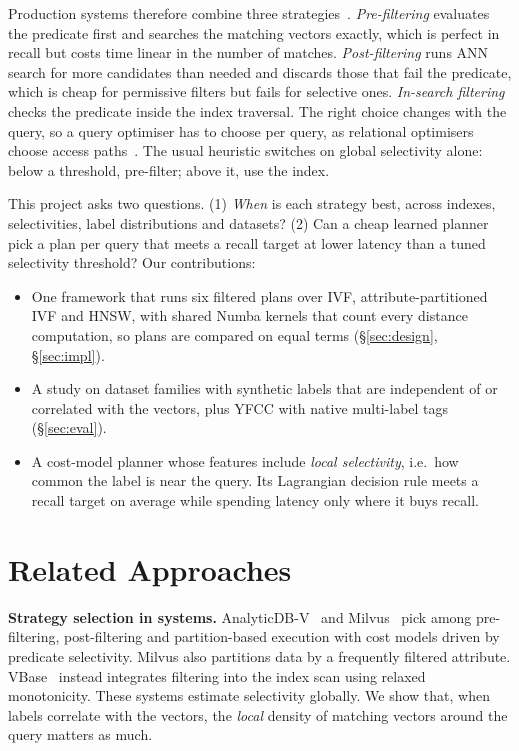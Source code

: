 \documentclass[sigconf,nonacm]{acmart}
\begin{document}
Production systems therefore combine three strategies~\cite{wei2020analyticdbv,wang2021milvus}. \emph{Pre-filtering} evaluates the predicate first and searches the matching vectors exactly, which is perfect in recall but costs time linear in the number of matches. \emph{Post-filtering} runs ANN search for more candidates than needed and discards those that fail the predicate, which is cheap for permissive filters but fails for selective ones. \emph{In-search filtering} checks the predicate inside the index traversal. The right choice changes with the query, so a query optimiser has to choose per query, as relational optimisers choose access paths~\cite{selinger1979access}. The usual heuristic switches on global selectivity alone: below a threshold, pre-filter; above it, use the index.

This project asks two questions. (1) \emph{When} is each strategy best, across indexes, selectivities, label distributions and datasets? (2) Can a cheap learned planner pick a plan per query that meets a recall target at lower latency than a tuned selectivity threshold? Our contributions:
\begin{itemize}
\item One framework that runs six filtered plans over IVF, attribute-partitioned IVF and HNSW, with shared Numba kernels that count every distance computation, so plans are compared on equal terms (\S\ref{sec:design}, \S\ref{sec:impl}).
\item A study on \nDatasets{} dataset families with synthetic labels that are independent of or correlated with the vectors, plus YFCC with native multi-label tags (\S\ref{sec:eval}).
\item A cost-model planner whose features include \emph{local selectivity}, i.e.\ how common the label is near the query. Its Lagrangian decision rule meets a recall target on average while spending latency only where it buys recall.
\end{itemize}

\section{Related Approaches}

\textbf{Strategy selection in systems.} AnalyticDB-V~\cite{wei2020analyticdbv} and Milvus~\cite{wang2021milvus} pick among pre-filtering, post-filtering and partition-based execution with cost models driven by predicate selectivity. Milvus also partitions data by a frequently filtered attribute. VBase~\cite{zhang2023vbase} instead integrates filtering into the index scan using relaxed monotonicity. These systems estimate selectivity globally. We show that, when labels correlate with the vectors, the \emph{local} density of matching vectors around the query matters as much.
\end{document}
